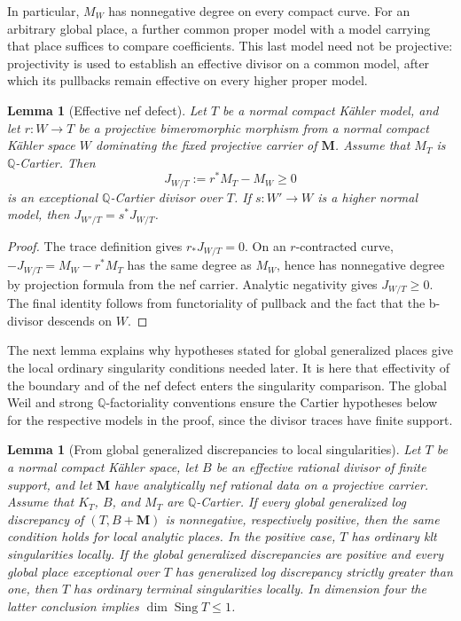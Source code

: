 \documentclass[11pt]{amsart}
\newtheorem{lemma}[theorem]{Lemma}
\theoremstyle{definition}
\theoremstyle{remark}
\numberwithin{equation}{section}
\newcommand{\Q}{\mathbb{Q}}
\newcommand{\M}{\mathbf{M}}
\DeclareMathOperator{\Sing}{Sing}
\begin{document}
In particular, $M_W$ has nonnegative degree on every compact curve.
For an arbitrary global place, a further common proper model with a
model carrying that place suffices to compare coefficients.  This last
model need not be projective: projectivity is used to establish an
effective divisor on a common model, after which its pullbacks remain
effective on every higher proper model.

\begin{lemma}[Effective nef defect]\label{lem:nef-defect}
Let $T$ be a normal compact K\"ahler model, and let $r:W\to T$ be a
projective bimeromorphic morphism from a normal compact K\"ahler space
$W$ dominating the fixed projective carrier of $\M$.  Assume that
$M_T$ is $\Q$-Cartier.  Then
\begin{equation}\label{eq:nef-defect}
 J_{W/T}:=r^*M_T-M_W\geq0
\end{equation}
is an exceptional $\Q$-Cartier divisor over $T$.  If $s:W'\to W$ is
a higher normal model, then $J_{W'/T}=s^*J_{W/T}$.
\end{lemma}

\begin{proof}
The trace definition gives $r_*J_{W/T}=0$.  On an $r$-contracted curve,
$-J_{W/T}=M_W-r^*M_T$ has the same degree as $M_W$, hence has
nonnegative degree by projection formula from the nef carrier.
Analytic negativity gives $J_{W/T}\geq0$.
The final identity follows from functoriality of pullback and the fact
that the b-divisor descends on $W$.
\end{proof}

The next lemma explains why hypotheses stated for global generalized
places give the local ordinary singularity conditions needed later.
It is here that effectivity of the boundary and of the nef defect
enters the singularity comparison.  The global Weil and strong
$\Q$-factoriality conventions ensure the Cartier hypotheses below for
the respective models in the proof, since the divisor traces have
finite support.

\begin{lemma}[From global generalized discrepancies to local singularities]
\label{lem:ordinary-singularities}
Let $T$ be a normal compact K\"ahler space, let $B$ be an effective
rational divisor of finite support, and let $\M$ have analytically nef
rational data on a projective carrier.  Assume that $K_T$, $B$, and
$M_T$ are $\Q$-Cartier.
If every global generalized log discrepancy of $(T,B+\M)$ is
nonnegative, respectively positive, then the same condition holds for
local analytic places.  In the positive case, $T$ has ordinary klt
singularities locally.  If the global generalized discrepancies are
positive and every global place exceptional over $T$ has generalized
log discrepancy strictly greater than one,
then $T$ has ordinary terminal singularities locally.  In dimension
four the latter conclusion implies $\dim\Sing T\leq1$.
\end{lemma}
\end{document}
